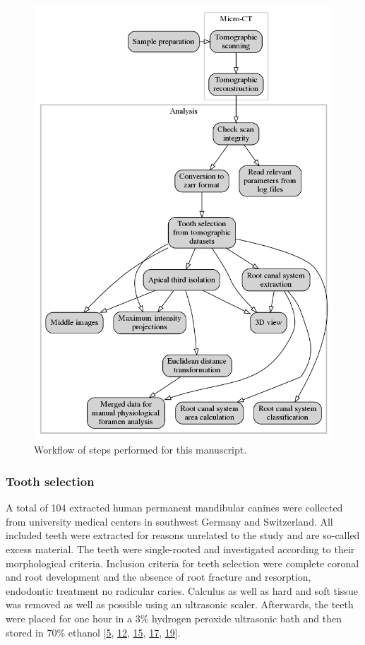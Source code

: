 \documentclass[
  american,
]{article}
\begin{document}
\begin{figure}
\hypertarget{fig:workflow}{%
\centering
\includegraphics{images/workflow.png}
\caption{Workflow of steps performed for this manuscript.}\label{fig:workflow}
}
\end{figure}

\hypertarget{tooth-selection}{%
\subsubsection{Tooth selection}\label{tooth-selection}}

A total of 104 extracted human permanent mandibular canines were collected from university medical centers in southwest Germany and Switzerland.
All included teeth were extracted for reasons unrelated to the study and are so-called excess material.
The teeth were single-rooted and investigated according to their morphological criteria.
Inclusion criteria for teeth selection were complete coronal and root development and the absence of root fracture and resorption, endodontic treatment no radicular caries.
Calculus as well as hard and soft tissue was removed as well as possible using an ultrasonic scaler.
Afterwards, the teeth were placed for one hour in a 3\% hydrogen peroxide ultrasonic bath and then stored in 70\% ethanol {[}\protect\hyperlink{ref-1HkTk4VKM}{5}, \protect\hyperlink{ref-OttTicsv}{12}, \protect\hyperlink{ref-amSKhLb1}{15}, \protect\hyperlink{ref-ZTgDEakx}{17}, \protect\hyperlink{ref-1Gn1pVZXt}{19}{]}.
\end{document}

